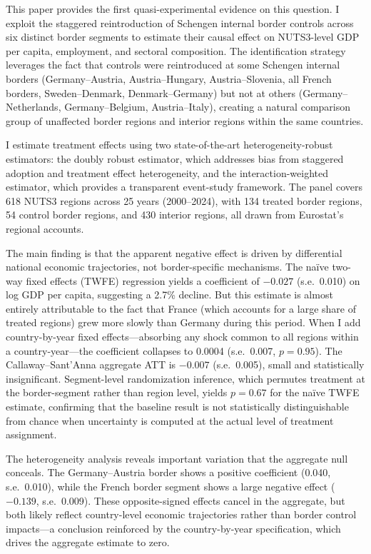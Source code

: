 \documentclass[12pt]{article}
\begin{document}
This paper provides the first quasi-experimental evidence on this question. I exploit the staggered reintroduction of Schengen internal border controls across six distinct border segments to estimate their causal effect on NUTS3-level GDP per capita, employment, and sectoral composition. The identification strategy leverages the fact that controls were reintroduced at some Schengen internal borders (Germany--Austria, Austria--Hungary, Austria--Slovenia, all French borders, Sweden--Denmark, Denmark--Germany) but not at others (Germany--Netherlands, Germany--Belgium, Austria--Italy), creating a natural comparison group of unaffected border regions and interior regions within the same countries.

I estimate treatment effects using two state-of-the-art heterogeneity-robust estimators: the \cite{CallawayS2021} doubly robust estimator, which addresses bias from staggered adoption and treatment effect heterogeneity, and the \cite{SunA2021} interaction-weighted estimator, which provides a transparent event-study framework. The panel covers 618 NUTS3 regions across 25 years (2000--2024), with 134 treated border regions, 54 control border regions, and 430 interior regions, all drawn from Eurostat's regional accounts.

The main finding is that the apparent negative effect is driven by differential national economic trajectories, not border-specific mechanisms. The na\"ive two-way fixed effects (TWFE) regression yields a coefficient of $-0.027$ (s.e.\ 0.010) on log GDP per capita, suggesting a 2.7\% decline. But this estimate is almost entirely attributable to the fact that France (which accounts for a large share of treated regions) grew more slowly than Germany during this period. When I add country-by-year fixed effects---absorbing any shock common to all regions within a country-year---the coefficient collapses to 0.0004 (s.e.\ 0.007, $p = 0.95$). The Callaway--Sant'Anna aggregate ATT is $-0.007$ (s.e.\ 0.005), small and statistically insignificant. Segment-level randomization inference, which permutes treatment at the border-segment rather than region level, yields $p = 0.67$ for the na\"ive TWFE estimate, confirming that the baseline result is not statistically distinguishable from chance when uncertainty is computed at the actual level of treatment assignment.

The heterogeneity analysis reveals important variation that the aggregate null conceals. The Germany--Austria border shows a positive coefficient (0.040, s.e.\ 0.010), while the French border segment shows a large negative effect ($-0.139$, s.e.\ 0.009). These opposite-signed effects cancel in the aggregate, but both likely reflect country-level economic trajectories rather than border control impacts---a conclusion reinforced by the country-by-year specification, which drives the aggregate estimate to zero.
\end{document}
